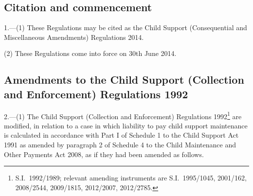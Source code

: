 \documentclass[12pt,a4paper]{article}
\begin{document}
\subsection[1. Citation and commencement]{Citation and commencement}

1.—(1) These Regulations may be cited as the Child Support (Consequential and Miscellaneous Amendments) Regulations 2014.

%
%
%
%

(2) These Regulations come into force on 30th June 2014.


\subsection[2. Amendments to the Child Support (Collection and Enforcement) Regulations 1992]{Amendments to the Child Support (Collection and Enforcement) Regulations 1992}

2.—(1) The Child Support (Collection and Enforcement) Regulations 1992\footnote{S.I.~1992/1989; relevant amending instruments are S.I.~1995/1045, 2001/162, 2008/2544, 2009/1815, 2012/2007, 2012/2785.} 
are modified, in relation to a case in which liability to pay child support maintenance is calculated in accordance with Part I of Schedule 1 to the Child Support Act 1991 as amended by paragraph 2 of Schedule 4 to the Child Maintenance and Other Payments Act 2008, as if they had been amended  %
as follows.
\end{document}
